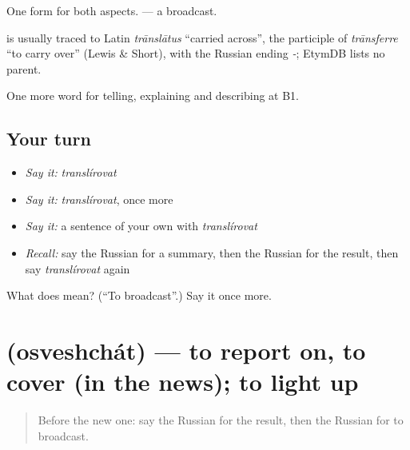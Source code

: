 One form for both aspects. \emph{} — a broadcast.

\begin{cousinweb}
\emph{} is usually traced to Latin \emph{trānslātus} \textquotedblleft{}carried across\textquotedblright{}, the participle of \emph{trānsferre} \textquotedblleft{}to carry over\textquotedblright{} (Lewis \& Short), with the Russian ending \emph{-}; EtymDB lists no parent.
\end{cousinweb}

\begin{grammarlens}[title={What you've built}]
One more word for telling, explaining and describing at B1.
\end{grammarlens}

\subsection*{Your turn}
\begin{itemize}
\raggedright
  \item \emph{Say it:} \emph{translírovat}
  \item \emph{Say it:} \emph{translírovat}, once more
  \item \emph{Say it:} a sentence of your own with \emph{translírovat}
  \item \emph{Recall:} say the Russian for a summary, then the Russian for the result, then say \emph{translírovat} again
\end{itemize}

\begin{tcolorbox}[breakable,colback=teal!4,colframe=teal!35!black,title={Before you move on}]
What does  mean? (\textquotedblleft{}To broadcast\textquotedblright{}.) Say it once more.
\end{tcolorbox}
\section[\texorpdfstring{\ru{освещать} (osveshchát)}{освещать (osveshchát)}]{ (osveshchát) — to report on, to cover (in the news); to light up}

\label{lesson:RU-C286-osveshchat}



\begin{quote}
Before the new one: say the Russian for the result, then the Russian for to broadcast.
\end{quote}


